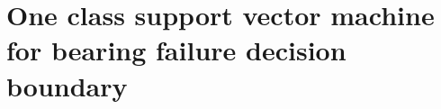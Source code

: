 \documentclass[../Main/thesis.tex]{subfiles}
\begin{document}
\chapter[One class support vector machine for bearing failure decision boundary]{One class support vector machine for bearing failure decision boundary}
\label{sec:ml}
\blankpage
\end{document}
